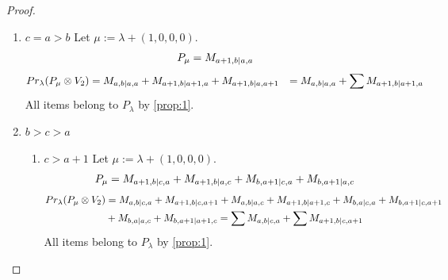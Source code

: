 \documentclass[12pt,a4paper]{article}
\begin{document}
\begin{proof}
\begin{enumerate}
\begin{enumerate}
\item $c=a+1$
        Let $\mu:=\lambda + (0,-1,0,1) $. 
\begin{equation}\notag
  \begin{aligned}
      P_{\mu} =M_{a,b-1|a+1,a+1}
  \end{aligned}
\end{equation}
\begin{equation}\notag
  \begin{aligned}
  Pr_{\lambda}(P_\mu \otimes V_5) &=
 M_{a+1,b|a+1,a+1}
+M_{a,b|a,a+1}
+M_{a,b|a+1,a}
                                  &=
\sum M_{a,b|a+1,a}
+ M_{a+1,b|a+1,a+1}
  \end{aligned}
\end{equation}
All items belong to $P_\lambda$ by \cref{prop:1}.
  \end{enumerate}
  
\item $c=a>b$
        Let $\mu:=\lambda + (1,0,0,0) $. 
\begin{equation}\notag
  \begin{aligned}
      P_{\mu} =M_{a+1,b|a,a}
  \end{aligned}
\end{equation}
\begin{equation}\notag
  \begin{aligned}
  Pr_{\lambda}(P_\mu \otimes V_2) &=
M_{a,b|a,a}
+M_{a+1,b|a+1,a}
+M_{a+1,b|a,a+1}
                                  &=
 M_{a,b|a,a}
+\sum M_{a+1,b|a+1,a}
  \end{aligned}
\end{equation}
All items belong to $P_\lambda$ by \cref{prop:1}.
  
\item $b>c>a$
  \begin{enumerate}
    \item $c>a+1$ 
        Let $\mu:=\lambda + (1,0,0,0) $. 
\begin{equation}\notag
  \begin{aligned}
      P_{\mu} =
      M_{a+1,b|c,a}
+M_{a+1,b|a,c}
+M_{b,a+1|c,a}
+M_{b,a+1|a,c}
  \end{aligned}
\end{equation}
\begin{equation}\notag
  \begin{aligned}
  Pr_{\lambda}(P_\mu \otimes V_2) &=
M_{a,b|c,a}
+M_{a+1,b|c,a+1}
+M_{a,b|a,c}
+M_{a+1,b|a+1,c} 
+M_{b,a|c,a}
+M_{b,a+1|c,a+1} \\
                                  &+
M_{b,a|a,c}
+M_{b,a+1|a+1,c}
=\sum M_{a,b|c,a}
+\sum M_{a+1,b|c,a+1}
  \end{aligned}
\end{equation}
All items belong to $P_\lambda$ by \cref{prop:1}.


\end{enumerate}
\end{enumerate}
\end{proof}
\end{document}
